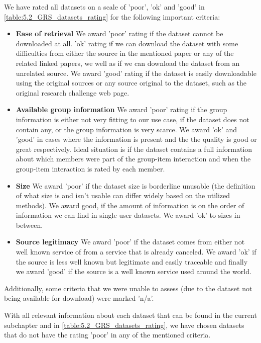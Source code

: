 We have rated all datasets on a scale of 'poor', 'ok' and 'good' in \ref{table:5.2_GRS_datasets_rating} for the following important criteria:
\begin{itemize}
    \item \textbf{Ease of retrieval} \newline
        We award 'poor' rating if the dataset cannot be downloaded at all. 'ok' rating if we can download the dataset with some difficulties from either the source in the mentioned paper or any of the related linked papers, we well as if we can download the dataset from an unrelated source. We award 'good' rating if the dataset is easily downloadable using the original sources or any source original to the dataset, such as the original research challenge web page.
    \item \textbf{Available group information} \newline
        We award 'poor' rating if the group information is either not very fitting to our use case, if the dataset does not contain any, or the group information is very scarce. We award 'ok' and 'good' in cases where the information is present and the the quality is good or great respectively. Ideal situation is if the dataset contains a full information about which members were part of the group-item interaction and when the group-item interaction is rated by each member.
    \item \textbf{Size}\newline
        We award 'poor' if the dataset size is borderline unusable (the definition of what size is and isn't usable can differ widely based on the utilized methods). We award good, if the amount of information is on the order of information we can find in single user datasets. We award 'ok' to sizes in between.
    \item \textbf{Source legitimacy} \newline
        We award 'poor' if the dataset comes from either not well known service of from a service that is already canceled. We award 'ok' if the source is less well known but legitimate and easily traceable and finally we award 'good' if the source is a well known service used around the world.
\end{itemize}

Additionally, some criteria that we were unable to assess (due to the dataset not being available for download) were marked 'n/a'.

With all relevant information about each dataset that can be found in the current subchapter and in \ref{table:5.2_GRS_datasets_rating}, we have chosen datasets that do not have the rating 'poor' in any of the mentioned criteria. %

